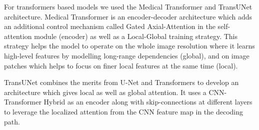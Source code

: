 \par
For transformers based models we used the Medical Transformer and TransUNet architecture. Medical Transformer is an encoder-decoder architecture which adds an additional control mechanism called Gated Axial-Attention in the self-attention module (encoder) as well as a Local-Global training strategy. This strategy helps the model to operate on the whole image resolution where it learns high-level features by modelling long-range dependencies (global), and on image patches which helps to focus on finer local features at the same time (local).

\par
TransUNet combines the merits from U-Net and Transformers to develop an architecture which gives local as well as global attention. It uses a CNN-Transformer Hybrid as an encoder along with skip-connections at different layers to leverage the localized attention from the CNN feature map in the decoding path.


